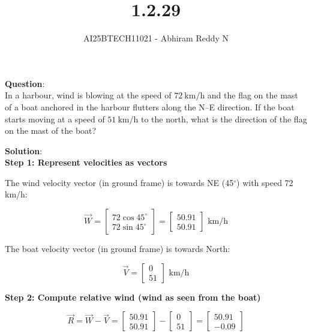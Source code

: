 \documentclass[journal]{IEEEtran}
\begin{document}

\vspace{3cm}

\title{1.2.29}
\author{AI25BTECH11021 - Abhiram Reddy N}
{\let\newpage\relax\maketitle}

\renewcommand{\thefigure}{\theenumi}
\renewcommand{\thetable}{\theenumi}
\setlength{\intextsep}{10pt} %


\renewcommand{\thetable}{\theenumi}


\textbf{Question}:\\In a harbour, wind is blowing at the speed of $72\ \mathrm{km/h}$ and the flag on the mast of a boat anchored in the harbour flutters along the N--E direction. If the boat starts moving at a speed of $51\ \mathrm{km/h}$ to the north, what is the direction of the flag on the mast of the boat?


\textbf{Solution}:\\

\textbf{Step 1: Represent velocities as vectors}

The wind velocity vector (in ground frame) is towards NE (45$^\circ$) with speed 72 km/h:

\[
\vec{W} = 
\begin{bmatrix}
72 \cos 45^\circ \\
72 \sin 45^\circ
\end{bmatrix}
=
\begin{bmatrix}
50.91 \\
50.91
\end{bmatrix} \text{ km/h}
\]

The boat velocity vector (in ground frame) is towards North:

\[
\vec{V} =
\begin{bmatrix}
0 \\
51
\end{bmatrix} \text{ km/h}
\]

\textbf{Step 2: Compute relative wind (wind as seen from the boat)}

\[
\vec{R} = \vec{W} - \vec{V} =
\begin{bmatrix}
50.91 \\
50.91
\end{bmatrix}
-
\begin{bmatrix}
0 \\
51
\end{bmatrix}
=
\begin{bmatrix}
50.91 \\
-0.09
\end{bmatrix}
\]
\end{document}
